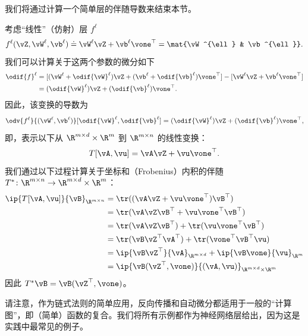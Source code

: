 \documentclass[../../book-main_zh.tex]{subfiles}
\begin{document}
我们将通过计算一个简单层的伴随导数来结束本节。
\begin{example}
    考虑“线性”（仿射）层 \(f^{\ell}\)
    \begin{equation}
        f^{\ell}(\vZ, \vW^{\ell}, \vb^{\ell}) \doteq \vW^{\ell}\vZ +
        \vb^{\ell}\vone^{\top} = \mat{\vW^{\ell} & \vb^{\ell}}.
    \end{equation}
    我们可以计算关于这两个参数的微分如下
    \begin{align}
        \odif{f}^{\ell}
        &= [(\vW^{\ell} + \odif{\vW}^{\ell})\vZ + (\vb^{\ell} +
        \odif{\vb}^{\ell})\vone^{\top}] - [\vW^{\ell}\vZ + \vb^{\ell}\vone^{\top}] \\
        &= (\odif{\vW}^{\ell})\vZ + (\odif{\vb}^{\ell})\vone^{\top}.
    \end{align}
    因此，该变换的导数为
    \begin{equation}
        \odv{f^{\ell}}{(\vW^{\ell}, \vb^{\ell})}[\odif{\vW}^{\ell},
        \odif{\vb}^{\ell}] = (\odif{\vW}^{\ell})\vZ +
        (\odif{\vb}^{\ell})\vone^{\top},
    \end{equation}
    即，表示以下从 \(\R^{m \times d} \times \R^{m}\) 到 \(\R^{m \times n}\) 的线性变换：
    \begin{equation}
        T[\vA, \vu] = \vA\vZ + \vu\vone^{\top}.
    \end{equation}
    我们通过以下过程计算关于坐标和（Frobenius）内积的伴随 \(T^{*} \colon \R^{m \times n} \to \R^{m
    \times d} \times \R^{m}\)：
    \begin{align}
        \ip{T[\vA, \vu]}{\vB}_{\R^{m \times n}}
        &= \tr((\vA\vZ + \vu\vone^{\top})\vB^{\top}) \\
        &= \tr(\vA\vZ\vB^{\top} + \vu\vone^{\top}\vB^{\top}) \\
        &= \tr(\vA\vZ\vB^{\top}) + \tr(\vu\vone^{\top}\vB^{\top}) \\
        &= \tr(\vB\vZ^{\top}\vA^{\top}) + \tr(\vone^{\top}\vB^{\top}\vu) \\
        &= \ip{\vB\vZ^{\top}}{\vA}_{\R^{m \times d}} +
        \ip{\vB\vone}{\vu}_{\R^{m}} \\
        &= \ip{\vB(\vZ^{\top}, \vone)}{(\vA, \vu)}_{\R^{m \times d}
        \times \R^{m}}
    \end{align}
    因此 \(T^{*}\vB = \vB(\vZ^{\top}, \vone)\)。
\end{example}

请注意，作为链式法则的简单应用，反向传播和自动微分都适用于一般的“计算图”，即（简单）函数的复合。我们将所有示例都作为神经网络层给出，因为这是实践中最常见的例子。
\end{document}
